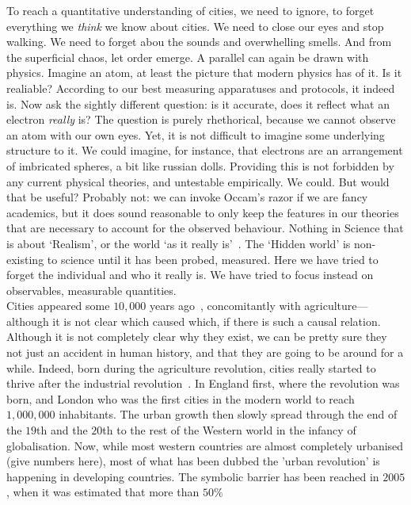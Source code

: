 To reach a quantitative understanding of cities, we need to ignore, to forget
everything we \emph{think} we know about cities. We need to close our eyes and
stop walking. We need to forget abou the sounds and overwhelling smells. And
from the superficial chaos, let order emerge. 
A parallel can again be drawn with physics. Imagine an atom, at least the
picture that modern physics has of it. Is it realiable? According to our best
measuring apparatuses and protocols, it indeed is. Now ask the sightly different
question: is it accurate, does it reflect what an electron \emph{really} is? The
question is purely rhethorical, because we cannot observe an atom with our own
eyes. Yet, it is not difficult to imagine some underlying structure to it. We
could imagine, for instance, that electrons are an arrangement of imbricated
spheres, a bit like russian dolls. Providing this is not forbidden by any
current physical theories, and untestable empirically. We could. But would that
be useful? Probably not: we can invoke Occam's razor if we are fancy academics,
but it does sound reasonable to only keep the features in our theories that are
necessary to account for the observed behaviour. Nothing in Science
that is about `Realism', or the world `as it really is'~\cite{VanFraassen}. The
`Hidden world' is non-existing to science until it has been probed, measured.
Here we have tried to forget the individual and who it really is. We have tried
to focus instead on observables, measurable quantities.\\

Cities appeared some $10,000$ years ago~\cite{Bairoch, Mumford}, concomitantly
with agriculture---although it is not clear which caused which, if there is such
a causal relation. Although it is not completely clear why they exist, we can be
pretty sure they not just an accident in human history, and that they are going
to be around for a while. Indeed, born during the agriculture revolution,
cities really started to thrive after the industrial revolution~\cite{Bairoch}.
In England first, where the revolution was born, and London who was the first
cities in the modern world to reach $1,000,000$ inhabitants. The urban growth
then slowly spread through the end of the $19$th and the $20$th to the rest of
the Western world in the infancy of globalisation. Now, while most western
countries are almost completely urbanised (give numbers here), most of what has
been dubbed the 'urban 
revolution' is happening in developing countries. The symbolic barrier has been
reached in $2005$, when it was estimated that more than $50\%$ \\


